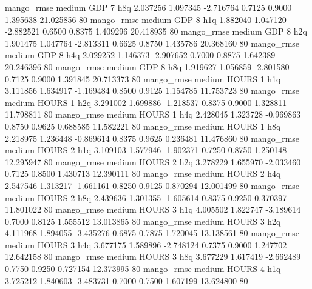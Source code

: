        mango_rmse     medium      GDP                 7                  h8q  2.037256 1.097345 -2.716764 0.7125 0.9000  1.395638   21.025856 80
       mango_rmse     medium      GDP                 8                  h1q  1.882040 1.047120 -2.882521 0.6500 0.8375  1.409296   20.418935 80
       mango_rmse     medium      GDP                 8                  h2q  1.901475 1.047764 -2.813311 0.6625 0.8750  1.435786   20.368160 80
       mango_rmse     medium      GDP                 8                  h4q  2.029252 1.146373 -2.907652 0.7000 0.8875  1.642389   20.246396 80
       mango_rmse     medium      GDP                 8                  h8q  1.919627 1.056859 -2.801580 0.7125 0.9000  1.391845   20.713373 80
       mango_rmse     medium    HOURS                 1                  h1q  3.111856 1.634917 -1.169484 0.8500 0.9125  1.154785   11.753723 80
       mango_rmse     medium    HOURS                 1                  h2q  3.291002 1.699886 -1.218537 0.8375 0.9000  1.328811   11.798811 80
       mango_rmse     medium    HOURS                 1                  h4q  2.428045 1.323728 -0.969863 0.8750 0.9625  0.688585   11.582221 80
       mango_rmse     medium    HOURS                 1                  h8q  2.218975 1.236448 -0.869614 0.8375 0.9625  0.236481   11.476860 80
       mango_rmse     medium    HOURS                 2                  h1q  3.109103 1.577946 -1.902371 0.7250 0.8750  1.250148   12.295947 80
       mango_rmse     medium    HOURS                 2                  h2q  3.278229 1.655970 -2.033460 0.7125 0.8500  1.430713   12.390111 80
       mango_rmse     medium    HOURS                 2                  h4q  2.547546 1.313217 -1.661161 0.8250 0.9125  0.870294   12.001499 80
       mango_rmse     medium    HOURS                 2                  h8q  2.439636 1.301355 -1.605614 0.8375 0.9250  0.370397   11.801022 80
       mango_rmse     medium    HOURS                 3                  h1q  4.005502 1.822747 -3.189614 0.7000 0.8125  1.555512   13.013865 80
       mango_rmse     medium    HOURS                 3                  h2q  4.111968 1.894055 -3.435276 0.6875 0.7875  1.720045   13.138561 80
       mango_rmse     medium    HOURS                 3                  h4q  3.677175 1.589896 -2.748124 0.7375 0.9000  1.247702   12.642158 80
       mango_rmse     medium    HOURS                 3                  h8q  3.677229 1.617419 -2.662489 0.7750 0.9250  0.727154   12.373995 80
       mango_rmse     medium    HOURS                 4                  h1q  3.725212 1.840603 -3.483731 0.7000 0.7500  1.607199   13.624800 80
